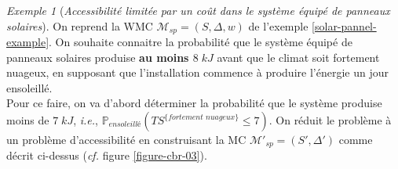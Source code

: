 \documentclass[12pt,a4paper]{report}
\theoremstyle{definition}%
\theoremstyle{remark}
\newtheorem{example}{Exemple}[chapter]
\newcommand{\ie}{\textit{i.e.}, }
\newcommand{\cf}{\textit{cf.} }
\newcommand{\pr}{\mathbb{P}}
\begin{document}
\begin{example}[\textit{Accessibilité limitée par un coût dans le système équipé de panneaux solaires}]
	On reprend la WMC $\mathcal{M}_{sp} = (S, \Delta, w)$ de l'exemple \ref{solar-pannel-example}. 
	On souhaite connaitre la probabilité que le système équipé de panneaux solaires produise \textbf{au moins $8 \; kJ$} avant que le climat soit fortement nuageux, en supposant que l'installation commence à produire l'énergie un jour ensoleillé.\\
	Pour ce faire, on va d'abord déterminer la probabilité que le système produise moins de $7\; kJ$, \ie $\pr_{\textit{ensoleillé}}(TS^{\{ \textit{fortement nuageux} \}} \leq 7)$. On réduit le problème à un problème d'accessibilité en construisant la MC $\mathcal{M'}_{sp} = (S', \Delta')$ comme décrit ci-dessus (\cf figure \ref{figure-cbr-03}).
	

\end{example}
\end{document}
